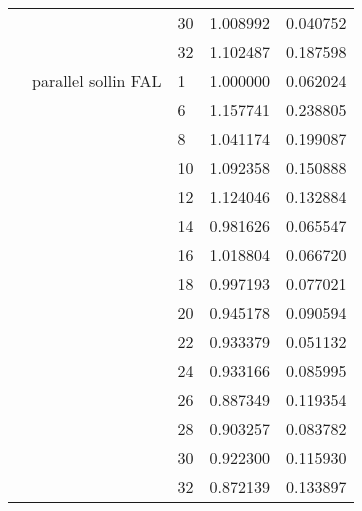 \begin{tabular}{lllrr}
                      &                     & 30 &  1.008992 &  0.040752 \\
                      &                     & 32 &  1.102487 &  0.187598 \\
                      & parallel sollin FAL & 1  &  1.000000 &  0.062024 \\
                      &                     & 6  &  1.157741 &  0.238805 \\
                      &                     & 8  &  1.041174 &  0.199087 \\
                      &                     & 10 &  1.092358 &  0.150888 \\
                      &                     & 12 &  1.124046 &  0.132884 \\
                      &                     & 14 &  0.981626 &  0.065547 \\
                      &                     & 16 &  1.018804 &  0.066720 \\
                      &                     & 18 &  0.997193 &  0.077021 \\
                      &                     & 20 &  0.945178 &  0.090594 \\
                      &                     & 22 &  0.933379 &  0.051132 \\
                      &                     & 24 &  0.933166 &  0.085995 \\
                      &                     & 26 &  0.887349 &  0.119354 \\
                      &                     & 28 &  0.903257 &  0.083782 \\
                      &                     & 30 &  0.922300 &  0.115930 \\
                      &                     & 32 &  0.872139 &  0.133897 \\
\bottomrule
\end{tabular}
